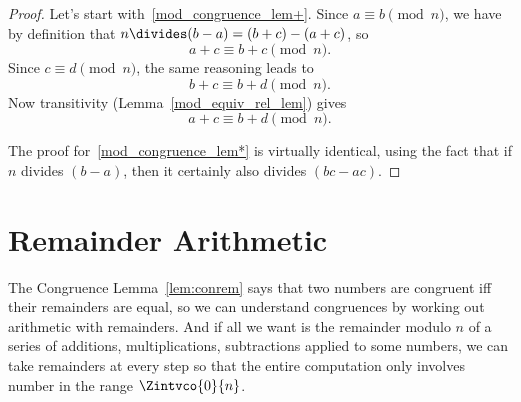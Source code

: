 \begin{proof}
Let's start with~\ref{mod_congruence_lem+}.  Since $a \equiv b
\pmod{n}$, we have by definition that $n \divides (b-a) =(b+c)-(a+c)$,
so
\[
a+c \equiv b+c \pmod{n}.
\]
Since $c \equiv d \pmod{n}$, the same reasoning leads to
\[
b + c \equiv b + d \pmod{n}.
\]
Now transitivity (Lemma~\ref{mod_equiv_rel_lem}) gives
\[
a + c \equiv b + d \pmod{n}.
\]
 
The proof for~\ref{mod_congruence_lem*} is virtually identical, using
the fact that if $n$ divides $(b-a)$, then it certainly also divides
$(bc-ac)$.
\end{proof}

\begin{problems}
\classproblems
{}
\end{problems}

\section{Remainder Arithmetic}\label{remainder_arithmetic_sec}

The Congruence Lemma~\ref{lem:conrem} says that two numbers are
congruent iff their remainders are equal, so we can understand
congruences by working out arithmetic with remainders.  And if all we
want is the remainder modulo $n$ of a series of additions,
multiplications, subtractions applied to some numbers, we can take
remainders at every step so that the entire computation only involves
number in the range $\Zintvco{0}{n}$.


